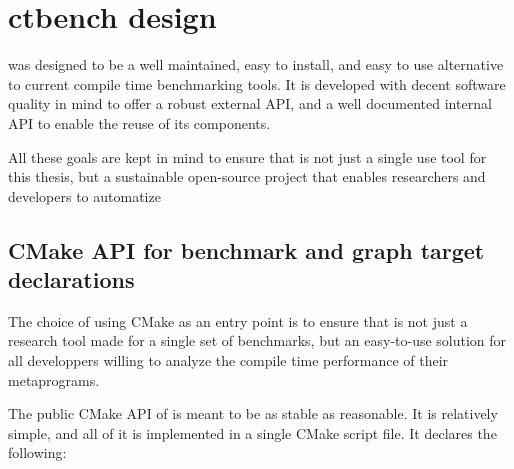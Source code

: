 \documentclass[../main]{subfiles}
\begin{document}
\section{
  ctbench design
}

\ctbench was designed to be a well maintained, easy to install,
and easy to use alternative to current compile time benchmarking tools.
It is developed with decent software quality in mind to offer a robust
external API, and a well documented internal API to enable the reuse of
its components.

All these goals are kept in mind to ensure that \ctbench is not just a single
use tool for this thesis, but a sustainable open-source project that enables
researchers and developers to automatize

\subsection{
  CMake API for benchmark and graph target declarations
}
\label{lbl:ctbench-cmake-api}

The choice of using CMake as an entry point is to ensure that \ctbench is not
just a research tool made for a single set of benchmarks, but an easy-to-use
solution for all \cpp developpers willing to analyze the compile time
performance of their metaprograms.

The public CMake API of \ctbench is meant to be as stable as reasonable.
It is relatively simple, and all of it is implemented in
a single CMake script file. It declares the following:
\end{document}
